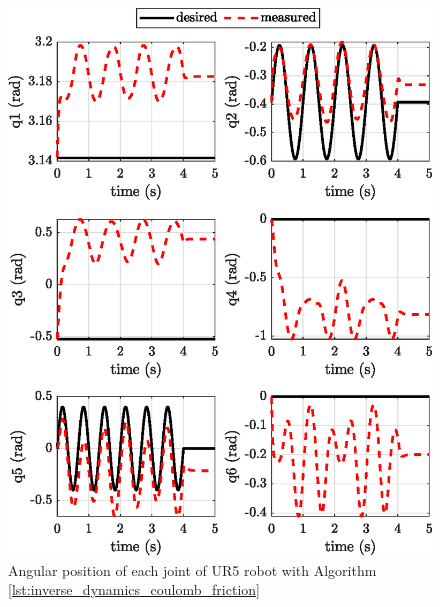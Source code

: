 \begin{figure}[H]
    \centering
    \includegraphics{images/act_2.8_mu_0.2/joint_position.eps}
    \caption{Angular position of each joint of UR5 robot with Algorithm \ref{lst:inverse_dynamics_coulomb_friction}}
    \label{fig:act_2.8_mu_0.2_joint_position}
\end{figure}

